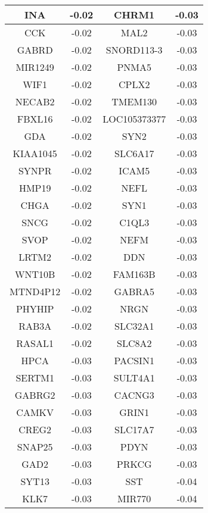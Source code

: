 \begin{longtable}{|c|c||c|c|}
		\hline
		INA & -0.02 & CHRM1 & -0.03 \\
		\hline
		CCK & -0.02 & MAL2 & -0.03 \\
		\hline
		GABRD & -0.02 & SNORD113-3 & -0.03 \\
		\hline
		MIR1249 & -0.02 & PNMA5 & -0.03 \\
		\hline
		WIF1 & -0.02 & CPLX2 & -0.03 \\
		\hline
		NECAB2 & -0.02 & TMEM130 & -0.03 \\
		\hline
		FBXL16 & -0.02 & LOC105373377 & -0.03 \\
		\hline
		GDA & -0.02 & SYN2 & -0.03 \\
		\hline
		KIAA1045 & -0.02 & SLC6A17 & -0.03 \\
		\hline
		SYNPR & -0.02 & ICAM5 & -0.03 \\
		\hline
		HMP19 & -0.02 & NEFL & -0.03 \\
		\hline
		CHGA & -0.02 & SYN1 & -0.03 \\
		\hline
		SNCG & -0.02 & C1QL3 & -0.03 \\
		\hline
		SVOP & -0.02 & NEFM & -0.03 \\
		\hline
		LRTM2 & -0.02 & DDN & -0.03 \\
		\hline
		WNT10B & -0.02 & FAM163B & -0.03 \\
		\hline
		MTND4P12 & -0.02 & GABRA5 & -0.03 \\
		\hline
		PHYHIP & -0.02 & NRGN & -0.03 \\
		\hline
		RAB3A & -0.02 & SLC32A1 & -0.03 \\
		\hline
		RASAL1 & -0.02 & SLC8A2 & -0.03 \\
		\hline
		HPCA & -0.03 & PACSIN1 & -0.03 \\
		\hline
		SERTM1 & -0.03 & SULT4A1 & -0.03 \\
		\hline
		GABRG2 & -0.03 & CACNG3 & -0.03 \\
		\hline
		CAMKV & -0.03 & GRIN1 & -0.03 \\
		\hline
		CREG2 & -0.03 & SLC17A7 & -0.03 \\
		\hline
		SNAP25 & -0.03 & PDYN & -0.03 \\
		\hline
		GAD2 & -0.03 & PRKCG & -0.03 \\
		\hline
		SYT13 & -0.03 & SST & -0.04 \\
		\hline
		KLK7 & -0.03 & MIR770 & -0.04 \\
		\hline
	\end{longtable}


